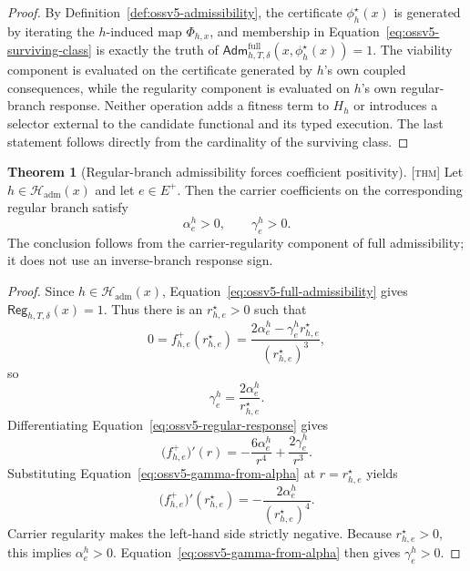 \documentclass[11pt]{article}
\newcommand{\Thm}{\textsc{[thm]}}
\theoremstyle{definition}
\newtheorem{theorem}[definition]{Theorem}
\begin{document}
\begin{proof}
By Definition~\ref{def:ossv5-admissibility}, the certificate
$\phi_h^\star(x)$ is generated by iterating the $h$-induced map
$\Phi_{h,x}$, and membership in Equation~\eqref{eq:ossv5-surviving-class} is
exactly the truth of
$\mathsf{Adm}^{\mathrm{full}}_{h,T,\delta}(x,\phi_h^\star(x))=1$.
The viability component is evaluated on the certificate generated by $h$'s own
coupled consequences, while the regularity component is evaluated on $h$'s own
regular-branch response.  Neither operation adds a fitness term to $H_h$ or
introduces a selector external to the candidate functional and its typed
execution.  The last statement follows directly from the cardinality of the
surviving class.
\end{proof}

\begin{theorem}[Regular-branch admissibility forces coefficient positivity]
\label{lem:ossv5-regularity-positivity}
\Thm{} Let $h\in\mathcal H_{\mathrm{adm}}(x)$ and let $e\in E^+$.
Then the carrier coefficients on the corresponding regular branch satisfy
\begin{equation}
\alpha_e^h>0,
\qquad
\gamma_e^h>0.
\label{eq:ossv5-coefficient-positivity}
\end{equation}
The conclusion follows from the carrier-regularity component of full
admissibility; it does not use an inverse-branch response sign.
\end{theorem}

\begin{proof}
Since $h\in\mathcal H_{\mathrm{adm}}(x)$,
Equation~\eqref{eq:ossv5-full-admissibility} gives
$\mathsf{Reg}_{h,T,\delta}(x)=1$.  Thus there is an
$r^\star_{h,e}>0$ such that
\begin{equation}
0=f^+_{h,e}(r^\star_{h,e})
=
\frac{2\alpha_e^h-\gamma_e^h r^\star_{h,e}}
{(r^\star_{h,e})^3},
\end{equation}
so
\begin{equation}
\gamma_e^h=\frac{2\alpha_e^h}{r^\star_{h,e}}.
\label{eq:ossv5-gamma-from-alpha}
\end{equation}
Differentiating Equation~\eqref{eq:ossv5-regular-response} gives
\begin{equation}
\bigl(f^+_{h,e}\bigr)'(r)
=-\frac{6\alpha_e^h}{r^4}+\frac{2\gamma_e^h}{r^3}.
\end{equation}
Substituting Equation~\eqref{eq:ossv5-gamma-from-alpha} at
$r=r^\star_{h,e}$ yields
\begin{equation}
\bigl(f^+_{h,e}\bigr)'(r^\star_{h,e})
=-\frac{2\alpha_e^h}{(r^\star_{h,e})^4}.
\end{equation}
Carrier regularity makes the left-hand side strictly negative.  Because
$r^\star_{h,e}>0$, this implies $\alpha_e^h>0$.  Equation~\eqref{eq:ossv5-gamma-from-alpha}
then gives $\gamma_e^h>0$.
\end{proof}
\end{document}
